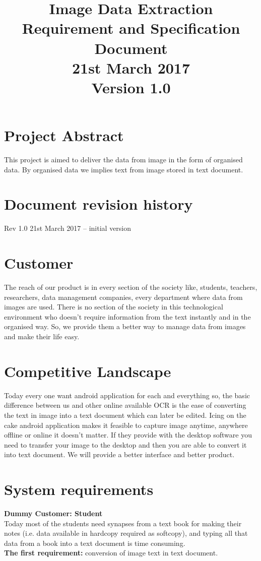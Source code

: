\documentclass[18 pt]{article}
\begin{document}
\begin{Large}

\title{Image Data Extraction\\
Requirement and Specification Document\\
21st March 2017\\
Version 1.0
}
\date{}
\maketitle


\section{Project Abstract}
This project is aimed to deliver the data from image in the form of organised data. By organised data we implies text from image stored in text document.
\section{Document revision history}  
Rev 1.0 21st March 2017 – initial version

\section{Customer}
The reach of our product is in every section of the society like, students, teachers, researchers, data management companies, every department where data from images are used. There is no section of the society in this technological environment who doesn’t require information from the text instantly and in the organised way. So, we provide them a better way to manage data from images and make their life easy.

\section{Competitive Landscape}
Today every one want android application for each and everything so, the basic difference between us and other online available OCR is the ease of converting the text in image into a text document which can later be edited. Icing on the cake android application makes it feasible to capture image anytime, anywhere offline or online it doesn't matter. If they provide with the desktop software you need to transfer your image to the desktop and then you are able to convert it into text document.
We will provide a better interface and better product.

\section{System requirements}
\textbf{Dummy Customer: Student}\\
Today most of the students need synapses from a text book for making their notes (i.e. data available in hardcopy required as softcopy), and typing all that data from a book into a text document is time consuming. \\
\textbf{The first requirement:} conversion of image text in text document.\\


\end{Large}
\end{document}

